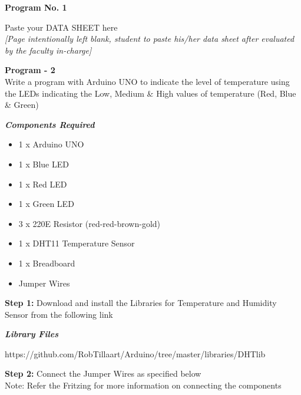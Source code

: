 \documentclass[12pt,a4paper]{article}
\begin{document}
\clearpage
\center \textbf{Program No. 1}\vspace{11cm}

Paste your DATA SHEET here\\
\textit{[Page intentionally left blank, student to paste his/her data sheet after evaluated by the faculty in-charge] }

\clearpage
\begin{center}
\large {\textbf{Program - 2}}\\
Write a program with Arduino UNO to indicate the level of temperature using the LEDs
indicating the Low, Medium \& High values of temperature (Red, Blue \& Green)
\end{center}
\begin{flushleft}

\textbf{\textit{Components Required}}
\begin{itemize}[noitemsep,nolistsep]
\item 1 x Arduino UNO
\item 1 x Blue LED
\item 1 x Red LED
\item 1 x Green LED
\item 3 x  220E Resistor (red-red-brown-gold)
\item 1 x DHT11 Temperature Sensor
\item 1 x Breadboard
\item Jumper Wires
\end{itemize}
\vspace{5mm}

\textbf{Step 1:} Download and install the Libraries for Temperature and Humidity Sensor from the following link\\
\vspace{5mm}

\textbf{\textit{Library Files}}\\ \begin{itemize}
https://github.com/RobTillaart/Arduino/tree/master/libraries/DHTlib
\end{itemize}
\vspace{5mm}

\textbf{Step 2:} Connect the Jumper Wires as specified below \\
Note: Refer the Fritzing for more information on connecting the components \\
\vspace{5mm}


\end{flushleft}
\end{document}
